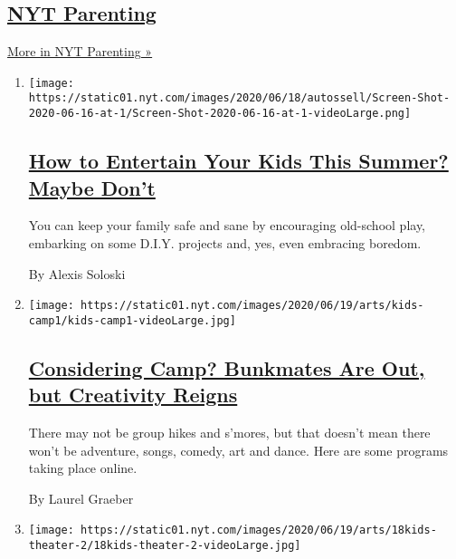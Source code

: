 \hypertarget{nyt-parenting}{%
\subsection{\texorpdfstring{\href{/spotlight/parenting}{NYT
Parenting}}{NYT Parenting}}\label{nyt-parenting}}

\href{/spotlight/parenting}{More in NYT Parenting »}

\begin{enumerate}
\def\labelenumi{\arabic{enumi}.}
\item
  \texttt{[image: https://static01.nyt.com/images/2020/06/18/autossell/Screen-Shot-2020-06-16-at-1/Screen-Shot-2020-06-16-at-1-videoLarge.png]}

  \hypertarget{how-to-entertain-your-kids-this-summer-maybe-dont}{%
  \subsection{\texorpdfstring{\href{/2020/06/18/arts/kids-summer-activities-virus.html}{How
  to Entertain Your Kids This Summer? Maybe
  Don't}}{How to Entertain Your Kids This Summer? Maybe Don't}}\label{how-to-entertain-your-kids-this-summer-maybe-dont}}

  You can keep your family safe and sane by encouraging old-school play,
  embarking on some D.I.Y. projects and, yes, even embracing boredom.

  By Alexis Soloski
\item
  \texttt{[image: https://static01.nyt.com/images/2020/06/19/arts/kids-camp1/kids-camp1-videoLarge.jpg]}

  \hypertarget{considering-camp-bunkmates-are-out-but-creativity-reigns}{%
  \subsection{\texorpdfstring{\href{/2020/06/18/arts/kids-summer-camps-virtual.html}{Considering
  Camp? Bunkmates Are Out, but Creativity
  Reigns}}{Considering Camp? Bunkmates Are Out, but Creativity Reigns}}\label{considering-camp-bunkmates-are-out-but-creativity-reigns}}

  There may not be group hikes and s'mores, but that doesn't mean there
  won't be adventure, songs, comedy, art and dance. Here are some
  programs taking place online.

  By Laurel Graeber
\item
  \texttt{[image: https://static01.nyt.com/images/2020/06/19/arts/18kids-theater-2/18kids-theater-2-videoLarge.jpg]}


\end{enumerate}

